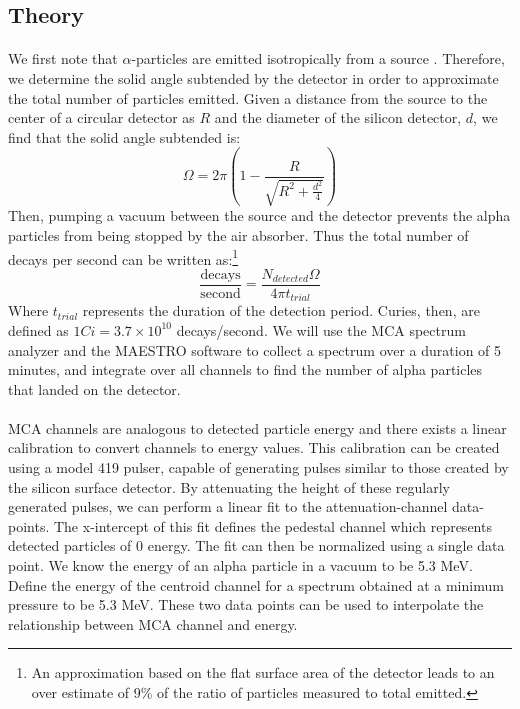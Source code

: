 \documentclass[12pt]{article}
\begin{document}
\begin{multicols}{2}
    \section{Theory}
    
    \paragraph{} We first note that $\alpha$-particles are emitted isotropically from a source \cite{kovash}. Therefore, we determine the solid angle subtended by the detector in order to approximate the total number of particles emitted. Given a distance from the source to the center of a circular detector as $R$ and the diameter of the silicon detector, $d$, we find that the solid angle subtended is:
    \begin{equation}
        \Omega = 2\pi\left(1-\frac{R}{\sqrt{R^2 + \frac{d^2}{4}}}\right)
        \label{solidAngle}
    \end{equation}
    Then, pumping a vacuum between the source and the detector prevents the alpha particles from being stopped by the air absorber. Thus the total number of decays per second can be written as:\footnote{An approximation based on the flat surface area of the detector leads to an over estimate of 9\% of the ratio of particles measured to total emitted.}
    \begin{equation}
        \frac{\text{decays}}{\text{second}} = \frac{N_{detected}\Omega}{4\pi t_{trial}}
    \end{equation}
    Where $t_{trial}$ represents the duration of the detection period. Curies, then, are defined as $1 Ci = 3.7 \times 10^{10}$ decays/second. We will use the MCA spectrum analyzer and the MAESTRO software to collect a spectrum over a duration of 5 minutes, and integrate over all channels to find the number of alpha particles that landed on the detector. \cite{kovash}

    \paragraph{} MCA channels are analogous to detected particle energy and there exists a linear calibration to convert channels to energy values. This calibration can be created using a model 419 pulser, capable of generating pulses similar to those created by the silicon surface detector. By attenuating the height of these regularly generated pulses, we can perform a linear fit to the attenuation-channel data-points. The x-intercept of this fit defines the pedestal channel which represents detected particles of 0 energy. The fit can then be normalized using a single data point. We know the energy of an alpha particle in a vacuum to be 5.3 MeV. Define the energy of the centroid channel for a spectrum obtained at a minimum pressure to be 5.3 MeV. These two data points can be used to interpolate the relationship between MCA channel and energy. \cite{kovash}


\end{multicols}
\end{document}
